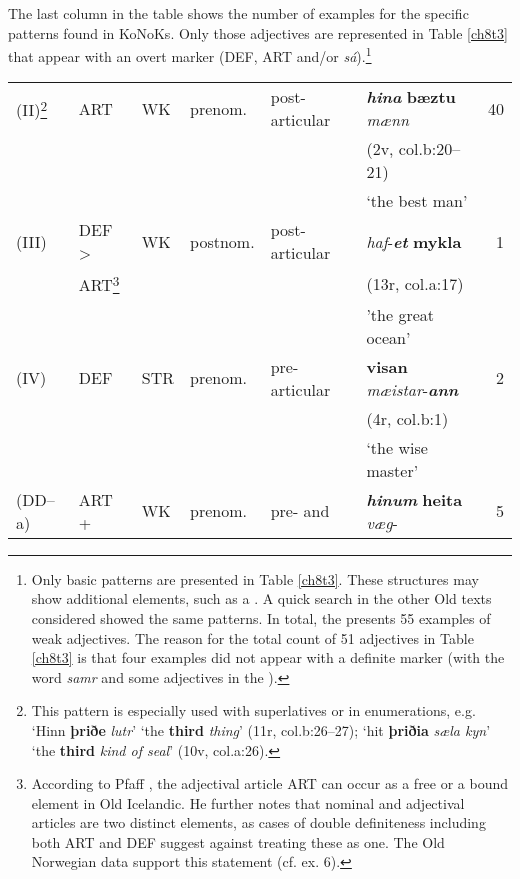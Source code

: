 \documentclass[output=paper,colorlinks,citecolor=brown]{langscibook}
\begin{document}
The last column in the table shows the number of examples for the specific patterns found in KoNoKs. Only those
adjectives are represented in Table \ref{ch8t3} that appear with an overt
 marker (DEF, ART and/or \emph{sá}).\footnote{Only basic patterns are presented in Table \ref{ch8t3}. These structures may show additional elements, such as a . A quick search in the other Old  texts considered showed the same patterns. In total, the  presents 55 examples of weak adjectives. The reason for the total count of 51 adjectives in Table \ref{ch8t3} is that four examples did not appear with a definite marker (with the word \textit{samr} and some adjectives in the ).}


\begin{table}\small
\begin{tabular}{llllllr}
\lsptoprule
(II)\footnote{This pattern is especially used with superlatives or in enumerations, e.g. `Hinn \textbf{þriðe} \textit{lutr}' ‘the \textbf{third} \textit{thing}’ (11r, col.b:26–27); `hit \textbf{þriðia} \textit{sæla kyn}' ‘the \textbf{third} \textit{kind of seal}’ (10v, col.a:26).} & ART & WK &
prenom. & post-articular & \textit{\textbf{hina}} \textbf{bæztu} \textit{mænn} & 40  \\ 
 & &  & &  &  (2v, col.b:20--21)  \\ 
 & &  & &  &  `the best man'   \\ 
(III) & DEF \textgreater{}  & WK & postnom. & post-articular & \textit{haf}-\textbf{\textit{et}} \textbf{mykla} &1 \\ 
  &   ART\footnote{According to Pfaff \citeyearpar[18f, 31]{Pfaff2019}, the
  adjectival article ART can occur as a free or a bound element in Old
  Icelandic. He further notes that nominal and adjectival
  articles are two distinct elements, as cases of double definiteness
  including both ART and DEF suggest against treating these as one. The
  Old Norwegian data support this statement (cf. ex. 6).}
  &  & &  &    (13r, col.a:17)  &  \\ 
  &   &  & &  &  'the great ocean' &  \\ 
(IV) & DEF & STR & prenom. & pre-articular & \textbf{visan} \textit{mæistar}-\textit{\textbf{ann}}  & 2 \\ 
 &  &  & &  & (4r, col.b:1)  &  \\ 
 &  &  & &  &  `the wise master' &  \\ 
(DD--a) & ART +  & WK & prenom. & pre- and  & \textbf{\textit{hinum}} \textbf{heita} \textit{væg}- &5  \\ 

\end{tabular}
\end{table}
\end{document}
